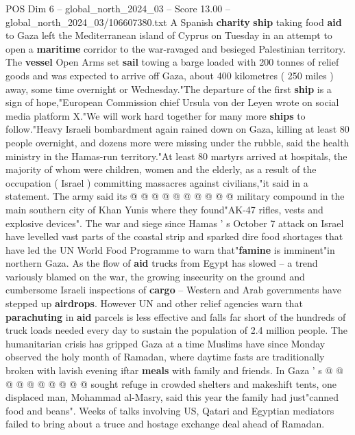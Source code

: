 \begin{textsample}{POS Dim 6 – global\_north\_2024\_03 – Score 13.00 – global\_north\_2024\_03/106607380.txt}  \label{ex:f6_pos_049}
A Spanish \textbf{charity} \textbf{ship} taking food \textbf{aid} to Gaza left the Mediterranean island of Cyprus on Tuesday in an attempt to open a \textbf{maritime} corridor to the war-ravaged and besieged Palestinian territory.
The \textbf{vessel} Open Arms set \textbf{sail} towing a barge loaded with 200 tonnes of relief goods and was expected to arrive off Gaza, about 400 kilometres ( 250 miles ) away, some time overnight or Wednesday."The departure of the first \textbf{ship} is a sign of hope,"European Commission chief Ursula von der Leyen wrote on social media platform X."We will work hard together for many more \textbf{ships} to follow."Heavy Israeli bombardment again rained down on Gaza, killing at least 80 people overnight, and dozens more were missing under the rubble, said the health ministry in the Hamas-run territory."At least 80 martyrs arrived at hospitals, the majority of whom were children, women and the elderly, as a result of the occupation ( Israel ) committing massacres against civilians,"it said in a statement.
The army said its @ @ @ @ @ @ @ @ @ @ military compound in the main southern city of Khan Yunis where they found"AK-47 rifles, vests and explosive devices".
The war and siege since Hamas ' s October 7 attack on Israel have levelled vast parts of the coastal strip and sparked dire food shortages that have led the UN World Food Programme to warn that"\textbf{famine} is imminent"in northern Gaza.
As the flow of \textbf{aid} trucks from Egypt has slowed -- a trend variously blamed on the war, the growing insecurity on the ground and cumbersome Israeli inspections of \textbf{cargo} -- Western and Arab governments have stepped up \textbf{airdrops}.
However UN and other relief agencies warn that \textbf{parachuting} in \textbf{aid} parcels is less effective and falls far short of the hundreds of truck loads needed every day to sustain the population of 2.4 million people.
The humanitarian crisis has gripped Gaza at a time Muslims have since Monday observed the holy month of Ramadan, where daytime fasts are traditionally broken with lavish evening iftar \textbf{meals} with family and friends.
In Gaza ' s @ @ @ @ @ @ @ @ @ @ sought refuge in crowded shelters and makeshift tents, one displaced man, Mohammad al-Masry, said this year the family had just"canned food and beans".
Weeks of talks involving US, Qatari and Egyptian mediators failed to bring about a truce and hostage exchange deal ahead of Ramadan.

\end{textsample}
